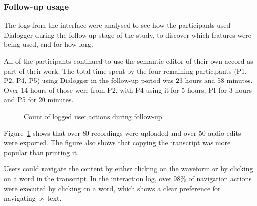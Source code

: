 \subsubsection{Follow-up usage}
The logs from the interface were analysed to see how the participants used Dialogger during the follow-up stage of the
study, to discover which features were being used, and for how long.

All of the participants continued to use the semantic editor of their own accord as part of their work. The total time
spent by the four remaining participants (P1, P2, P4, P5) using Dialogger in the follow-up period was 23 hours and 58
minutes.  Over 14 hours of those were from P2, with P4 using it for 5 hours, P1 for 3 hours and P5 for 20 minutes.

\begin{figure}
\centering
  \caption{Count of logged user actions during follow-up}
  \label{fig:actions}
\end{figure}

Figure~\ref{fig:actions} shows that over 80 recordings were uploaded and over 50 audio edits were exported. The figure
also shows that copying the transcript was more popular than printing it.

Users could navigate the content by either clicking on the waveform or by clicking on a word in the transcript. In the
interaction log, over 98\% of navigation actions were executed by clicking on a word, which shows a clear preference
for navigating by text.


